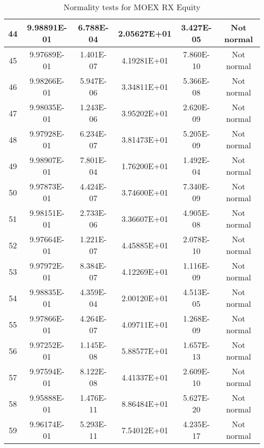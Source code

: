 \begin{table}[h]
\begin{tabular}{|c|c|c|c|c|c|}
		44 & 9.98891E-01 & 6.788E-04 & 2.05627E+01 & 3.427E-05 & Not normal\\\hline
		45 & 9.97689E-01 & 1.401E-07 & 4.19281E+01 & 7.860E-10 & Not normal\\\hline
		46 & 9.98266E-01 & 5.947E-06 & 3.34811E+01 & 5.366E-08 & Not normal\\\hline
		47 & 9.98035E-01 & 1.243E-06 & 3.95202E+01 & 2.620E-09 & Not normal\\\hline
		48 & 9.97928E-01 & 6.234E-07 & 3.81473E+01 & 5.205E-09 & Not normal\\\hline
		49 & 9.98907E-01 & 7.801E-04 & 1.76200E+01 & 1.492E-04 & Not normal\\\hline
		50 & 9.97873E-01 & 4.424E-07 & 3.74600E+01 & 7.340E-09 & Not normal\\\hline
		51 & 9.98151E-01 & 2.733E-06 & 3.36607E+01 & 4.905E-08 & Not normal\\\hline
		52 & 9.97664E-01 & 1.221E-07 & 4.45885E+01 & 2.078E-10 & Not normal\\\hline
		53 & 9.97972E-01 & 8.384E-07 & 4.12269E+01 & 1.116E-09 & Not normal\\\hline
		54 & 9.98835E-01 & 4.359E-04 & 2.00120E+01 & 4.513E-05 & Not normal\\\hline
		55 & 9.97866E-01 & 4.264E-07 & 4.09711E+01 & 1.268E-09 & Not normal\\\hline
		56 & 9.97252E-01 & 1.145E-08 & 5.88577E+01 & 1.657E-13 & Not normal\\\hline
		57 & 9.97594E-01 & 8.122E-08 & 4.41337E+01 & 2.609E-10 & Not normal\\\hline
		58 & 9.95888E-01 & 1.476E-11 & 8.86484E+01 & 5.627E-20 & Not normal\\\hline
		59 & 9.96174E-01 & 5.293E-11 & 7.54012E+01 & 4.235E-17 & Not normal\\\hline
	\end{tabular}
	\caption{Normality tests for MOEX RX Equity}
	\label{tab:normality_tests_MOEX_RX}
\end{table}
